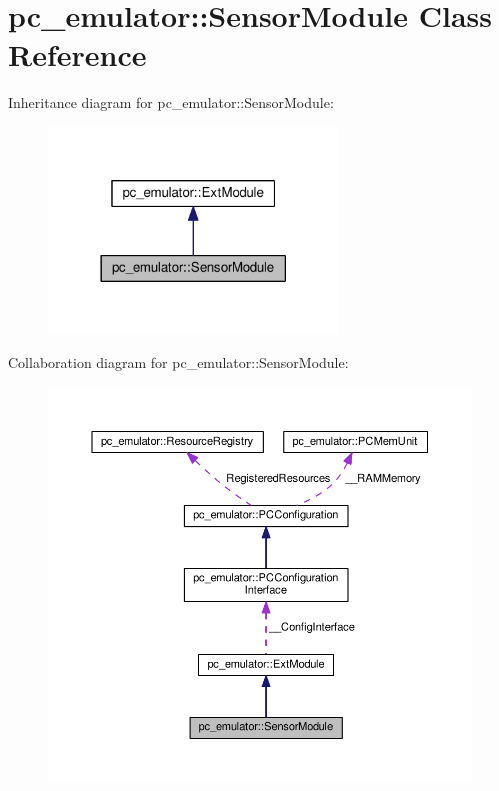\hypertarget{classpc__emulator_1_1SensorModule}{}\section{pc\+\_\+emulator\+:\+:Sensor\+Module Class Reference}
\label{classpc__emulator_1_1SensorModule}


Inheritance diagram for pc\+\_\+emulator\+:\+:Sensor\+Module\+:\nopagebreak
\begin{figure}[H]
\begin{center}
\leavevmode
\includegraphics[width=218pt]{classpc__emulator_1_1SensorModule__inherit__graph}
\end{center}
\end{figure}


Collaboration diagram for pc\+\_\+emulator\+:\+:Sensor\+Module\+:\nopagebreak
\begin{figure}[H]
\begin{center}
\leavevmode
\includegraphics[width=350pt]{classpc__emulator_1_1SensorModule__coll__graph}
\end{center}
\end{figure}
